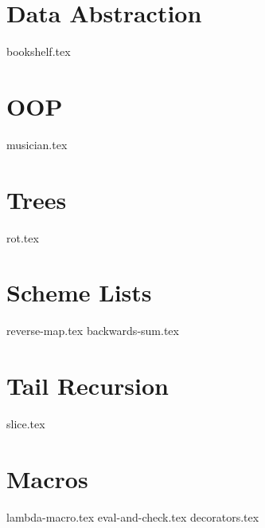 \documentclass{exam}
\begin{document}
\section{Data Abstraction}
\begin{questions}
{bookshelf.tex}
\end{questions}

\section{OOP}
\begin{questions}
{musician.tex}
\end{questions}

\section{Trees}
\begin{questions}
{rot.tex}
\end{questions}

\section{Scheme Lists}
\begin{questions}
{reverse-map.tex}
{backwards-sum.tex}
\end{questions}

\section{Tail Recursion}
\begin{questions}
{slice.tex}
\end{questions}

\section{Macros}
\begin{questions}
{lambda-macro.tex}
{eval-and-check.tex}
{decorators.tex}
\end{questions}

\end{document}
